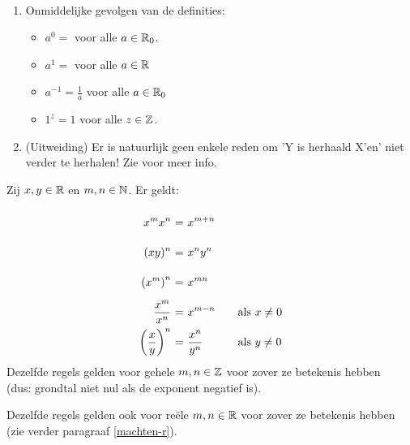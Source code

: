 \documentclass{ximera}
\begin{document}
\begin{remark} \ 
	
	\begin{enumerate}
	\item Onmiddelijke gevolgen van de definities:
			\begin{itemize}
			\item $a^0=$ voor alle $a\in\mathbb{R}_0$.
			\item $a^1=$ voor alle $a\in\mathbb{R}$
			\item $a^{-1}=\frac{1}{a}$ voor alle $a\in\mathbb{R}_0$
			\item $1^z=1$ voor alle $z\in\mathbb{Z}$.
		\end{itemize}
	\item (Uitweiding) Er is natuurlijk geen enkele reden om 'Y is herhaald X'en' niet verder te herhalen! Zie  voor meer info.
\end{enumerate} 
\end{remark}

\begin{proposition}
	Zij $x,y\in\mathbb{R}$ en $m,n\in\mathbb{N}$. Er geldt:
	\[
	\arraycolsep=1.4pt\def\arraystretch{2.2}
	\begin{array}{r@{\ =\ }l@{\qquad}l}
	\ds{x^{m}x^{n}}&\ds{x^{m+n}}&\\
	\ds{(xy)^n}&\ds{x^ny^n}&\\
	\ds{\left(x^{m}\right)^{n}}&\ds{x^{mn}}&\\
	\ds{\frac{x^{m}}{x^{n}}}&\ds{x^{m-n}}&\textrm{als }x\neq0\\
	\ds{\left(\frac{x}{y}\right)^{n}}&\ds{\frac{x^{n}}{y^{n}}}&\textrm{als }y\neq0\\
	\end{array}
	\]
	Dezelfde regels gelden voor gehele $m,n\in\mathbb{Z}$ voor zover ze betekenis hebben 
	\\ (dus: grondtal niet nul als de exponent negatief is).
	
	Dezelfde regels gelden ook voor reële $m,n\in\mathbb{R}$ voor zover ze betekenis hebben
	\\ (zie verder paragraaf \ref{machten-r}).

\end{proposition}
\end{document}
